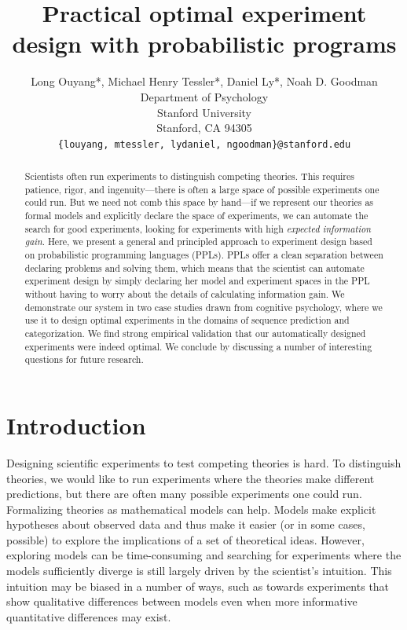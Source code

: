 \documentclass{article}
\title{Practical optimal experiment design with probabilistic programs}
\author{
  Long Ouyang*, Michael Henry Tessler*, Daniel Ly*, Noah D. Goodman\\
  Department of Psychology\\
  Stanford University\\
  Stanford, CA 94305 \\
  \texttt{\{louyang, mtessler, lydaniel, ngoodman\}@stanford.edu}\\
}
\newcommand{\ndg}[1]{\textcolor{Green}{[ndg: #1]}}
\newcommand{\mht}[1]{\textcolor{Blue}{[mht: #1]}}
\newcommand{\lou}[1]{\textcolor{orange}{[lou: #1]}}
\begin{document}

\maketitle

\begin{abstract}

Scientists often run experiments to distinguish competing theories.
This requires patience, rigor, and ingenuity---there is often a large space of possible experiments one could run.
But we need not comb this space by hand---if we represent our theories as formal models and explicitly declare the space of experiments, we can automate the search for good experiments, looking for experiments with high \emph{expected information gain}.
Here, we present a general and principled approach to experiment design based on probabilistic programming languages (PPLs).
PPLs offer a clean separation between declaring problems and solving them, which means that the scientist can automate experiment design by simply declaring her model and experiment spaces in the PPL without having to worry about the details of calculating information gain.
We demonstrate our system in two case studies drawn from cognitive psychology, where we use it to design optimal experiments in the domains of sequence prediction and categorization.
We find strong empirical validation that our automatically designed experiments were indeed optimal.
We conclude by discussing a number of interesting questions for future research.


\end{abstract}


\section{Introduction}
Designing scientific experiments to test competing theories is hard.
To distinguish theories, we would like to run experiments where the theories make different predictions, but there are often many possible experiments one could run.
Formalizing theories as mathematical models can help.
Models make explicit hypotheses about observed data and thus make it easier (or in some cases, possible) to explore the implications of a set of theoretical ideas.
However, exploring models can be time-consuming and searching for experiments where the models sufficiently diverge is still largely driven by the scientist's intuition.
This intuition may be biased in a number of ways, such as towards experiments that show qualitative differences between models even when more informative quantitative differences may exist.
\end{document}
